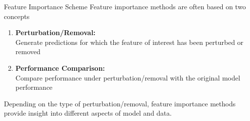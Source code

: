 \begin{frame}{Feature Importance Scheme}
Feature importance methods are often based on two concepts
\lz
\begin{enumerate}
  \item \textbf{Perturbation/Removal:}\\
  Generate predictions for which the feature of interest has been perturbed or removed
  \item \textbf{Performance Comparison:} \\
  Compare performance under perturbation/removal with the original model performance
\end{enumerate}
\lz
Depending on the type of perturbation/removal, feature importance methods provide insight into different aspects of model and data.
\end{frame}


